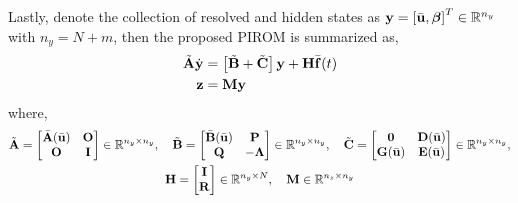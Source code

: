 Lastly, denote the collection of resolved and hidden states as $\mathbf{y} = \left[\bar{\mathbf{u}},\boldsymbol{\beta}\right]^T\in\mathbb{R}^{n_y}$ with $n_y = N+m$, then the proposed PIROM is summarized as,
\begin{subequations}\label{eqn_pirom_general}
    \begin{align}
        \tilde{\mathbf{A}}\dot{\mathbf{y}} &= \left[\tilde{\mathbf{B}} +\tilde{\mathbf{C}}\right]\mathbf{y} + \mathbf{H}\bar{\mathbf{f}}(t)\\
        \mathbf{z} &= \mathbf{M}\mathbf{y}
    \end{align}
\end{subequations}
where,
\begin{subequations}
    \begin{gather}
        \tilde{\mathbf{A}} = \begin{bmatrix}
            \bar{\mathbf{A}}(\bar{\mathbf{u}}) & \mathbf{O}\\
            \mathbf{O} & \mathbf{I}
        \end{bmatrix}\in\mathbb{R}^{n_y\times n_y},\quad \tilde{\mathbf{B}} = \begin{bmatrix}
            \bar{\mathbf{B}}(\bar{\mathbf{u}}) & \mathbf{P}\\
            \mathbf{Q} & -\boldsymbol{\Lambda}
        \end{bmatrix}\in\mathbb{R}^{n_y\times n_y},\quad \tilde{\mathbf{C}} = \begin{bmatrix}
            \boldsymbol{0} & \mathbf{D}(\bar{\mathbf{u}})\\
            \mathbf{G}(\bar{\mathbf{u}}) & \mathbf{E}(\bar{\mathbf{u}})
        \end{bmatrix}\in\mathbb{R}^{n_y\times n_y},\\
        \mathbf{H} = \begin{bmatrix}
            \mathbf{I} \\
            \mathbf{R}
        \end{bmatrix}\in\mathbb{R}^{n_y\times N},\quad  \mathbf{M}\in\mathbb{R}^{n_z\times n_y}
    \end{gather}
\end{subequations}

